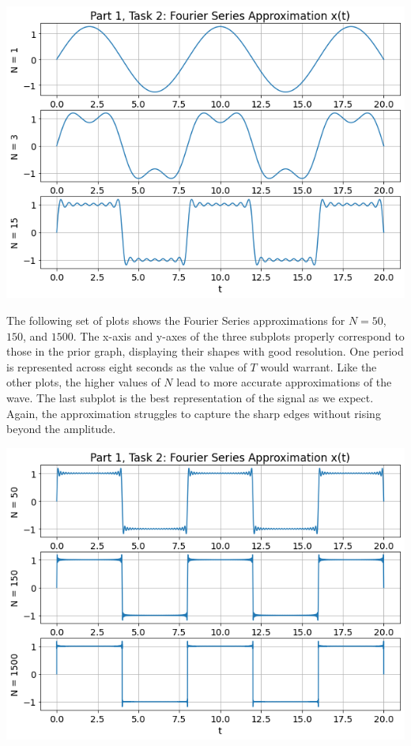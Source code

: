 \documentclass[12pt]{report}
\begin{document}
\begin{center}
	\includegraphics[scale = 0.48]{Lab 8 - Plots/Part1-Task2(1).png}\\[1.0 cm]
\end{center}

The following set of plots shows the Fourier Series approximations for $ N = 50 $, $ 150 $, and $ 1500 $. The x-axis and y-axes of the three subplots properly correspond to those in the prior graph, displaying their shapes with good resolution. One period is represented across eight seconds as the value of $ T $ would warrant. Like the other plots, the higher values of $ N $ lead to more accurate approximations of the wave. The last subplot is the best representation of the signal as we expect. Again, the approximation struggles to capture the sharp edges without rising beyond the amplitude. \\

\begin{center}
	\includegraphics[scale = 0.48]{Lab 8 - Plots/Part1-Task2(2).png}\\[1.0 cm]
\end{center}
\end{document}
